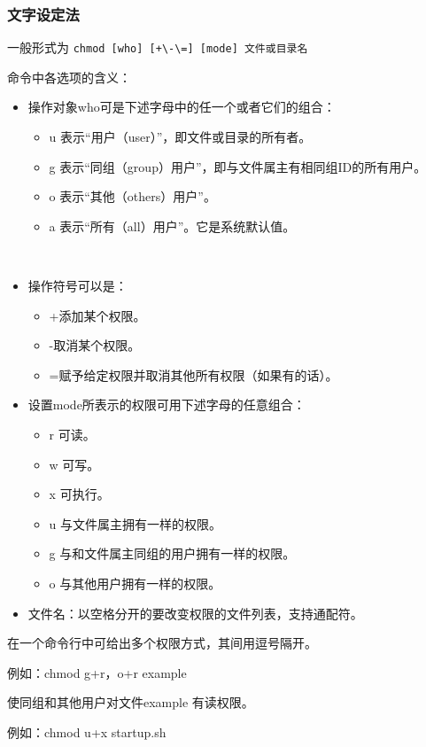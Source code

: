 \subsubsection{文字设定法}
一般形式为
\verb*|chmod [who] [+\-\=] [mode] 文件或目录名|

命令中各选项的含义：
\begin{itemize}
\item 操作对象who可是下述字母中的任一个或者它们的组合：
\begin{itemize}
\item u 表示“用户（user）”，即文件或目录的所有者。　　
\item g 表示“同组（group）用户”，即与文件属主有相同组ID的所有用户。　　
\item o 表示“其他（others）用户”。　　
\item a 表示“所有（all）用户”。它是系统默认值。　
\end{itemize}　

\item 操作符号可以是：
\begin{itemize}
\item +添加某个权限。
\item -取消某个权限。　　
\item =赋予给定权限并取消其他所有权限（如果有的话）。　　
\end{itemize}

\item 设置mode所表示的权限可用下述字母的任意组合：　　
\begin{itemize}
\item r 可读。　　
\item w 可写。　　
\item x 可执行。　　
\item u 与文件属主拥有一样的权限。
\item g 与和文件属主同组的用户拥有一样的权限。
\item o 与其他用户拥有一样的权限。
\end{itemize}

\item 文件名：以空格分开的要改变权限的文件列表，支持通配符。

\end{itemize}

在一个命令行中可给出多个权限方式，其间用逗号隔开。

例如：chmod g+r，o+r example

使同组和其他用户对文件example 有读权限。

例如：chmod u+x startup.sh

